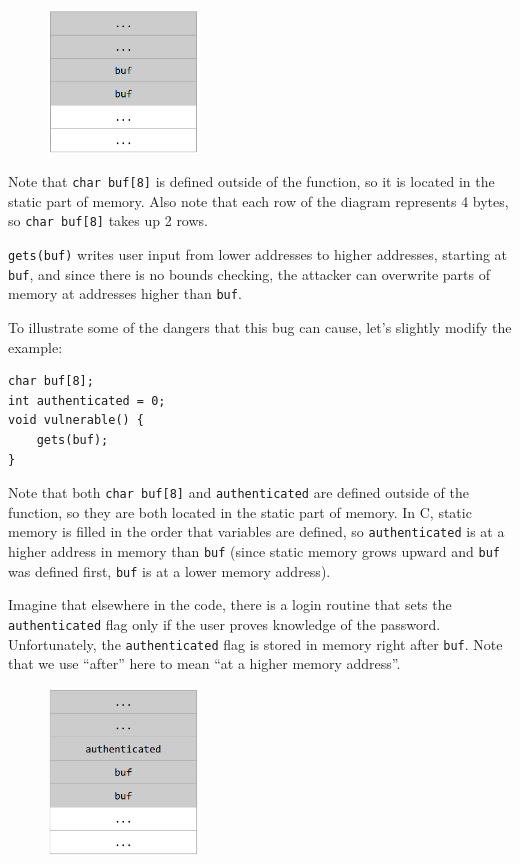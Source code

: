 \documentclass[a4paper]{exam}
\theoremstyle{definition}
\begin{document}
\begin{figure}
\centering
\includegraphics[width=4cm]{./img/overflow1.png}
\caption{}
\end{figure}

Note that \texttt{char\ buf{[}8{]}} is defined outside of the function,
so it is located in the static part of memory. Also note that each row
of the diagram represents 4 bytes, so \texttt{char\ buf{[}8{]}} takes up
2 rows.

\texttt{gets(buf)} writes user input from lower addresses to higher
addresses, starting at \texttt{buf}, and since there is no bounds
checking, the attacker can overwrite parts of memory at addresses higher
than \texttt{buf}.

To illustrate some of the dangers that this bug can cause, let's
slightly modify the example:

\begin{verbatim}
char buf[8];
int authenticated = 0;
void vulnerable() {
    gets(buf);
}
\end{verbatim}

Note that both \texttt{char\ buf{[}8{]}} and \texttt{authenticated} are
defined outside of the function, so they are both located in the static
part of memory. In C, static memory is filled in the order that
variables are defined, so \texttt{authenticated} is at a higher address
in memory than \texttt{buf} (since static memory grows upward and
\texttt{buf} was defined first, \texttt{buf} is at a lower memory
address).

Imagine that elsewhere in the code, there is a login routine that sets
the \texttt{authenticated} flag only if the user proves knowledge of the
password. Unfortunately, the \texttt{authenticated} flag is stored in
memory right after \texttt{buf}. Note that we use ``after'' here to mean
``at a higher memory address''.

\begin{figure}
\centering
\includegraphics[width=4cm]{./img/overflow2.png}
\caption{}
\end{figure}
\end{document}
